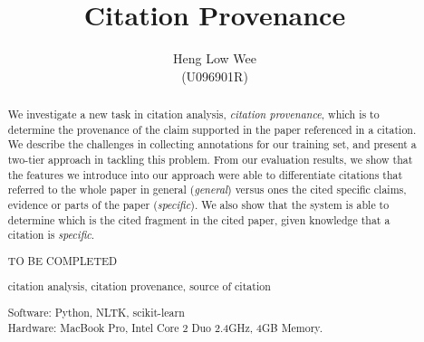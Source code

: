 \documentclass[hyp]{socreport}
\begin{document}
\title{Citation Provenance}
\author{Heng Low Wee \\ (U096901R)}
\maketitle
\begin{abstract}
\paragraph{}
We investigate a new task in citation analysis, {\it citation provenance}, which is to determine the provenance of the claim supported in the paper referenced in a citation. We describe the challenges in collecting annotations for our training set, and present a two-tier approach in tackling this problem.
 From our evaluation results, we show that the features we introduce into our approach were able to differentiate citations that referred to the whole paper in general ({\it general}) versus ones the cited specific claims, evidence or parts of the paper ({\it specific}).  We also show that the system is able to determine which is the cited fragment in the cited paper, given knowledge that a citation is {\it specific}.

\begin{descriptors}
	\item TO BE COMPLETED
\end{descriptors}
\begin{keywords}
	citation analysis, citation provenance, source of citation
\end{keywords}
\begin{implement}
\begin{flushleft}
\hspace{5 mm}Software: Python, NLTK, scikit-learn\\
\hspace{5 mm}Hardware: MacBook Pro, Intel Core 2 Duo 2.4GHz, 4GB Memory.
\end{flushleft}
\end{implement}
\end{abstract}
\end{document}
